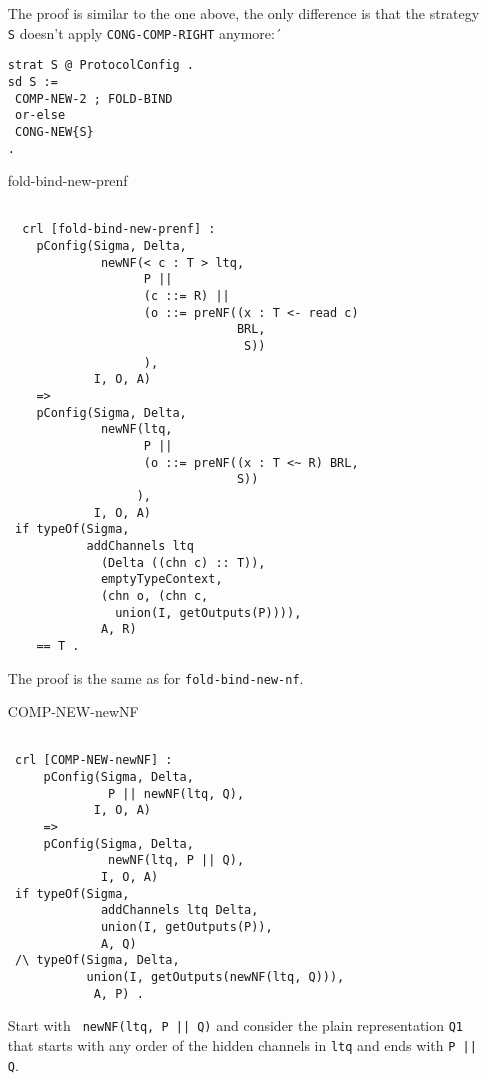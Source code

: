 \documentclass{article}
\begin{document}
\begin{itemize}
\begin{lstlisting}
    \end{lstlisting}
    
   The proof is similar to the one above, the only difference is that
   the strategy \verb+S+ doesn't apply \verb+CONG-COMP-RIGHT+ anymore:´
\begin{lstlisting}
strat S @ ProtocolConfig . 
sd S := 
 COMP-NEW-2 ; FOLD-BIND
 or-else
 CONG-NEW{S}
.
\end{lstlisting}  

\item[fold-bind-new-prenf]
 \begin{lstlisting}       
            
  crl [fold-bind-new-prenf] :
    pConfig(Sigma, Delta, 
             newNF(< c : T > ltq,
                   P || 
                   (c ::= R) || 
                   (o ::= preNF((x : T <- read c) 
                                BRL, 
                                 S))
                   ),
            I, O, A)
    => 
    pConfig(Sigma, Delta, 
             newNF(ltq, 
                   P || 
                   (o ::= preNF((x : T <~ R) BRL, 
                                S))
                  ),
            I, O, A) 
 if typeOf(Sigma, 
           addChannels ltq 
             (Delta ((chn c) :: T)), 
             emptyTypeContext, 
             (chn o, (chn c, 
               union(I, getOutputs(P)))), 
             A, R) 
    == T .        
                \end{lstlisting}
                
   The proof is the same as for \verb+fold-bind-new-nf+.             

\item[COMP-NEW-newNF]
 \begin{lstlisting}  
            
 crl [COMP-NEW-newNF] :
     pConfig(Sigma, Delta, 
              P || newNF(ltq, Q), 
            I, O, A)
     =>   
     pConfig(Sigma, Delta, 
              newNF(ltq, P || Q), 
             I, O, A)
 if typeOf(Sigma, 
             addChannels ltq Delta, 
             union(I, getOutputs(P)), 
             A, Q)
 /\ typeOf(Sigma, Delta, 
           union(I, getOutputs(newNF(ltq, Q))), 
            A, P) .
   \end{lstlisting}
   
  Start with \verb+ newNF(ltq, P || Q)+ and consider
  the plain representation \verb+Q1+ that starts with any order of the
  hidden channels in \verb+ltq+ and ends with \verb+P || Q+.
  

\end{itemize}
\end{document}
